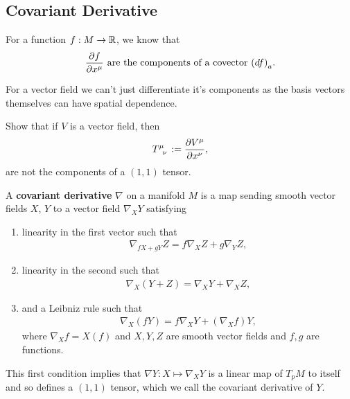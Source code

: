 \subsection{Covariant Derivative}

For a function $f : M \to \mathbb{R}$, we know that
\begin{align}
    \pdv{f}{x^{\mu}}  \text{~are the components of a covector $\left( df \right)_a$}
.\end{align}

For a vector field we can't just differentiate it's components as the basis vectors themselves can have spatial dependence.

\begin{exercise}
    Show that if $V$ is a vector field, then
    \begin{align}
        \tensor{T}{^{\mu}_\nu} := \pdv{V^{\mu}}{x^{\nu}}
    ,\end{align}
    are not the components of a $\left( 1,1 \right) $ tensor.
\end{exercise}

\begin{definition}
    A \textbf{covariant derivative} $\nabla$ on a manifold $M$ is a map sending smooth vector fields $X$, $Y$ to a vector field $\nabla_X Y$ satisfying
    \begin{enumerate}[label=\roman*)]
        \item linearity in the first vector such that
            \begin{align}
        \nabla_{f X + g Y} Z = f \nabla_X Z + g \nabla_Y Z
        ,\end{align}
        \item linearity in the second such that
        \begin{align}
            \nabla_X \left( Y + Z \right) = \nabla_X Y + \nabla_X Z
        ,\end{align}
        \item and a Leibniz rule such that
        \begin{align}
            \nabla_X \left( f Y \right) = f \nabla_X Y + \left( \nabla_X f \right) Y
        ,\end{align}
        where $\nabla_X f = X \left( f \right) $ and $X,Y,Z$ are smooth vector fields and $f,g$ are functions.
\end{enumerate}
\end{definition}

\begin{note}
    This first condition implies that $\nabla Y : X \mapsto \nabla_X Y$ is a linear map of $T_{p} M$ to itself and so defines a $\left( 1,1 \right) $ tensor, which we call the covariant derivative of $Y$.
\end{note}

